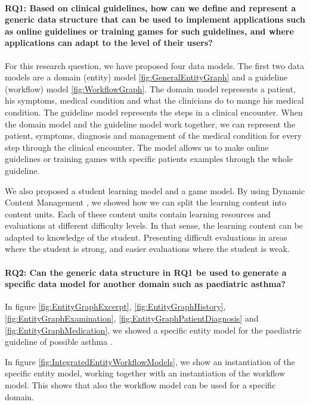 \paragraph{\textbf{RQ1:} Based on clinical guidelines, how can we define and represent a generic data structure that can be used to implement applications such as online guidelines or training games for such guidelines, and where applications can adapt to the level of their users?}

For this research question, we have proposed four data models. The first two data models are a domain (entity) model \ref{fig:GeneralEntityGraph} and a guideline (workflow) model \ref{fig:WorkflowGraph}. The domain model represents a patient, his symptoms, medical condition and what the clinicians do to mange his medical condition. The guideline model represents the steps in a clinical encounter. When the domain model and the guideline model work together, we can represent the patient, symptoms, diagnosis and management of the medical condition for every step through the clinical encounter. The model allows us to make online guidelines or training games with specific patients examples through the whole guideline.

We also proposed a student learning model and a game model. By using Dynamic Content Management \parencite{Eide2008}, we showed how we can split the learning content into content units. Each of these content units contain learning resources and evaluations at different difficulty levels. In that sense, the learning content can be adapted to knowledge of the student. Presenting difficult evaluations in areas where the student is strong, and easier evaluations where the student is weak. 

\paragraph{RQ2: Can the generic data structure in RQ1 be used to generate a specific data model for another domain such as paediatric asthma?}

In figure \ref{fig:EntityGraphExcerpt}, \ref{fig:EntityGraphHistory}, \ref{fig:EntityGraphExamination}, \ref{fig:EntityGraphPatientDiagnosis} and \ref{fig:EntityGraphMedication}, we showed a specific entity model for the paediatric guideline of possible asthma \parencite{RepublicofKeny2016}. 

In figure \ref{fig:IntegratedEntityWorkflowModels}, we show an instantiation of the specific entity model, working together with an instantiation of the workflow model. This shows that also the workflow model can be used for a specific domain.

